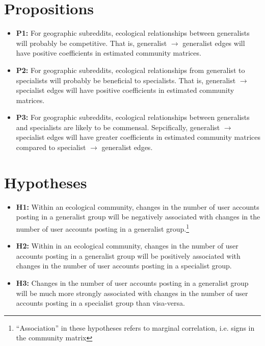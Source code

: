 \documentclass[12pt]{memoir}
\begin{document}
\section{Propositions}

\begin{itemize}
\item \textbf{P1:} For geographic subreddits, ecological relationships between generalists will probably be competitive. That is, generalist $\rightarrow$ generalist edges will have positive coefficients in estimated community matrices. 

\item \textbf{P2:} For geographic subreddits, ecological relationships from generalist to specialists will probably be beneficial to specialists. That is, generalist $\rightarrow$ specialist edges will have positive coefficients in estimated community matrices.

\item \textbf{P3:} For geographic subreddits, ecological relationships between generalists and specialists are likely to be commensal. Sepcifically, generalist $\rightarrow$ specialist edges will have greater coefficients in estimated community matrices compared to specialist $\rightarrow$ generalist edges. 

\end{itemize}

\section{Hypotheses}
\begin{itemize}

\item \textbf{H1:} Within an ecological community, changes in the number of user accounts posting in a generalist group will be negatively associated with changes in the number of user accounts posting in a generalist group.\footnote{``Association'' in these hypotheses refers to marginal correlation, i.e. signs in the community matrix}

\item \textbf{H2:} Within in an ecological community, changes in the number of user accounts posting in a generalist group will be positively associated with changes in the number of user accounts posting in a specialist group.

\item \textbf{H3:} Changes in the number of user accounts posting in a generalist group will be much more strongly associated with changes in the number of user accounts posting in a specialist group than visa-versa.

\end{itemize}
\end{document}
